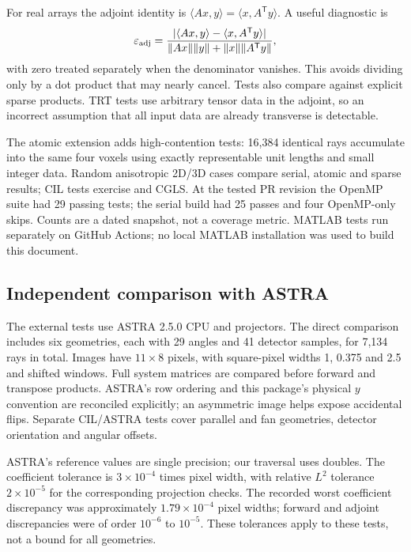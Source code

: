 \documentclass[11pt,a4paper]{article}
\newcommand{\code}[1]{\texttt{\detokenize{#1}}}
\begin{document}
For real arrays the adjoint identity is
$\langle Ax,y\rangle=\langle x,A^\mathsf{T}y\rangle$. A useful diagnostic is
\begin{equation}
 \varepsilon_{\rm adj}=
 \frac{|\langle Ax,y\rangle-\langle x,A^\mathsf{T}y\rangle|}
 {\lVert Ax\rVert\lVert y\rVert+\lVert x\rVert\lVert A^\mathsf{T}y\rVert},
 \label{eq:adjtest}
\end{equation}
with zero treated separately when the denominator vanishes. This avoids
dividing only by a dot product that may nearly cancel. Tests also compare
against explicit sparse products. TRT tests use arbitrary tensor data in
the adjoint, so an incorrect assumption that all input data are already
transverse is detectable.

The atomic extension adds high-contention tests: 16,384 identical rays
accumulate into the same four voxels using exactly representable unit
lengths and small integer data. Random anisotropic 2D/3D cases compare
serial, atomic and sparse results; CIL tests exercise \code{out} and CGLS.
At the tested PR revision the OpenMP suite had 29 passing tests; the serial
build had 25 passes and four OpenMP-only skips. Counts are a dated snapshot,
not a coverage metric. MATLAB tests run separately on GitHub Actions; no
local MATLAB installation was used to build this document.

\subsection{Independent comparison with ASTRA}
\label{sec:astra}
The external tests use ASTRA 2.5.0 CPU \code{line} and \code{line_fanflat}
projectors. The direct comparison includes six geometries, each with 29
angles and 41 detector samples, for 7,134 rays in total. Images have
$11\times8$ pixels, with square-pixel widths 1, 0.375 and 2.5 and shifted
windows. Full system matrices are compared before forward and transpose
products. ASTRA's row ordering and this package's physical $y$ convention
are reconciled explicitly; an asymmetric image helps expose accidental
flips. Separate CIL/ASTRA tests cover parallel and fan geometries,
detector orientation and angular offsets.

ASTRA's reference values are single precision; our traversal uses doubles.
The coefficient tolerance is $3\times10^{-4}$ times pixel width, with
relative $L^2$ tolerance $2\times10^{-5}$ for the corresponding projection
checks. The recorded worst coefficient discrepancy was approximately
$1.79\times10^{-4}$ pixel widths; forward and adjoint discrepancies were
of order $10^{-6}$ to $10^{-5}$. These tolerances apply to these tests,
not a bound for all geometries.
\end{document}
